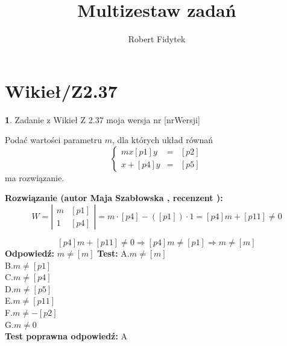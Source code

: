 \documentclass[12pt, a4paper]{article}
\title{Multizestaw zadań}
\author{Robert Fidytek}
\date{}
\theoremstyle{definition} %
\newtheorem{zad}{}
\newcommand{\kategoria}[1]{\section{#1}} %
\newcommand{\zadStart}[1]{\begin{zad}#1\newline} %
\newcommand{\zadStop}{\end{zad}}   %
\newcommand{\rozwStart}[2]{\noindent \textbf{Rozwiązanie (autor #1 , recenzent #2): }\newline} %
\newcommand{\rozwStop}{\newline}                                            %
\newcommand{\odpStart}{\noindent \textbf{Odpowiedź:}\newline}    %
\newcommand{\odpStop}{\newline}                                             %
\newcommand{\testStart}{\noindent \textbf{Test:}\newline} %
\newcommand{\testStop}{\newline} %
\newcommand{\kluczStart}{\noindent \textbf{Test poprawna odpowiedź:}\newline} %
\newcommand{\kluczStop}{\newline} %
\begin{document}
\maketitle


\kategoria{Wikieł/Z2.37}
\zadStart{Zadanie z Wikieł Z 2.37  moja wersja nr [nrWersji]}


Podać wartości parametru $m$, dla których układ równań
$$\left\{\begin{array}{rcl}
mx [p1]y&=&[p2]\\
 x+[p4]y&=&[p5]
\end{array} \right.$$
ma rozwiązanie.
\zadStop
\rozwStart{Maja Szabłowska}{}
$$W=\left| \begin{array}{lccr} m & [p1]  \\ 1 & [p4] \end{array}\right| = m\cdot [p4] -([p1])\cdot 1=[p4]m+[p11] \neq 0$$

$$[p4]m +[p11] \neq 0 \Rightarrow [p4]m\neq [p1] \Rightarrow m\neq [m]$$
\rozwStop
\odpStart
$m\neq [m]$
\odpStop
\testStart
A.$m\neq [m]$\\
B.$m\neq [p1]$\\
C.$m\neq [p4]$\\
D.$m\neq [p5]$\\
E.$m\neq [p11]$\\
F.$m\neq -[p2]$\\
G.$m\neq 0$\\
\testStop
\kluczStart
A
\kluczStop
\end{document}
